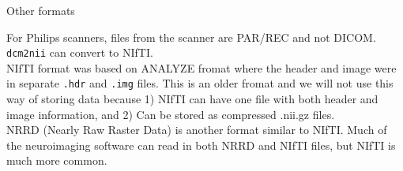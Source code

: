 \documentclass[11pt]{beamer}\usepackage[]{graphicx}\usepackage[]{color}
\begin{document}
\begin{frame}[fragile]{Other formats}

For Philips scanners, files from the scanner are PAR/REC and not DICOM.  \verb|dcm2nii| can convert to NIfTI. \\

NIfTI format was based on ANALYZE fromat where the header and image were in separate \verb|.hdr| and \verb|.img| files.  This is an older fromat and we will not use this way of storing data because 1) NIfTI can have one file with both header and image information, and 2) Can be stored as compressed .nii.gz files.\\

NRRD (Nearly Raw Raster Data) is another format similar to NIfTI.  Much of the neuroimaging software can read in both NRRD and NIfTI files, but NIfTI is much more common.

\end{frame}
\end{document}
